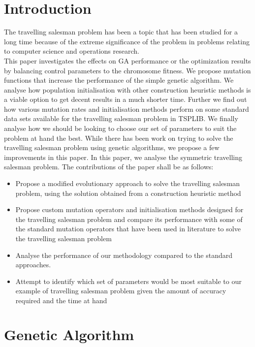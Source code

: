 \documentclass{article}
\begin{document}
\section{Introduction}
\label{introduction}
The travelling salesman problem has been a topic that has been studied for a long time because of the extreme significance of the problem in problems relating to computer science and operations research.
\\This paper investigates the effects on GA performance or the
optimization results by balancing control parameters to the
chromosome fitness. We propose mutation functions that increase the performance of the simple genetic algorithm. We analyse how population initialisation with other construction heuristic methods is a viable option to get decent results in a much shorter time. Further we find out how various mutation rates and initialisation methods perform on some standard data sets available for the travelling salesman problem in TSPLIB. We finally analyse how we should be looking to choose our set of parameters to suit the problem at hand the best.
While there has been work on trying to solve the travelling salesman problem using genetic algorithms, we propose a few improvements in this paper. In this paper, we analyse the symmetric travelling salesman problem. The contributions of the paper shall be as follows:
\begin{itemize}
\item Propose a modified evolutionary approach to solve the travelling salesman problem, using the solution obtained from a construction heuristic method 
\item Propose custom mutation operators and initialisation methods designed for the travelling salesman problem and compare its performance with some of the standard mutation operators that have been used in literature to solve the travelling salesman problem
\item Analyse the performance of our methodology compared to the standard approaches.
\item Attempt to identify which set of parameters would be most suitable to our example of travelling salesman problem given the amount of accuracy required and the time at hand
\end{itemize}


\section{Genetic Algorithm}
\end{document}
